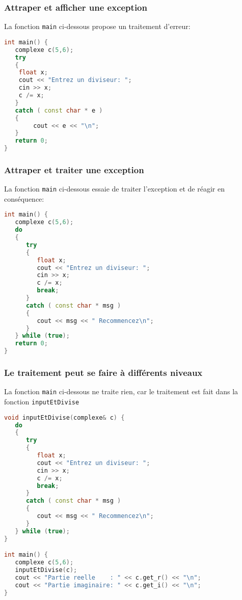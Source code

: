 \documentclass{beamer}
\begin{document}
\begin{frame}[fragile=singleslide,shrink=20]
\frametitle {Attraper et afficher une exception}

La fonction \texttt{main} ci-dessous propose un traitement d'erreur:
\begin{lstlisting}[language=c++]
int main() {
   complexe c(5,6);
   try
   {
   	float x;
   	cout << "Entrez un diviseur: ";
    cin >> x;
    c /= x;
   }
   catch ( const char * e )
   {
    	cout << e << "\n";
   }
   return 0;
}
\end{lstlisting}
\end{frame}

\begin{frame}[fragile=singleslide,shrink=20]
\frametitle {Attraper et traiter une exception}

La fonction \texttt{main} ci-dessous essaie de traiter l'exception et de réagir en conséquence:
\begin{lstlisting}[language=c++]
int main() {
   complexe c(5,6);
   do
   {
      try
      {
         float x;
         cout << "Entrez un diviseur: ";
         cin >> x;
         c /= x;
         break;
      }
      catch ( const char * msg )
      {
         cout << msg << " Recommencez\n";
      }
   } while (true);
   return 0;
}
\end{lstlisting}
\end{frame}

\begin{frame}[fragile=singleslide,shrink=20]
\frametitle {Le traitement peut se faire à différents niveaux}

La fonction \texttt{main} ci-dessous ne traite rien, car le traitement est fait dans la fonction \texttt{inputEtDivise}
\begin{lstlisting}[language=c++]
void inputEtDivise(complexe& c) {
   do
   {
      try
      {
         float x;
         cout << "Entrez un diviseur: ";
         cin >> x;
         c /= x;
         break;
      }
      catch ( const char * msg )
      {
         cout << msg << " Recommencez\n";
      }
   } while (true);
}

int main() {
   complexe c(5,6);
   inputEtDivise(c);
   cout << "Partie reelle    : " << c.get_r() << "\n";
   cout << "Partie imaginaire: " << c.get_i() << "\n";
}
\end{lstlisting}
\end{frame}
\end{document}
